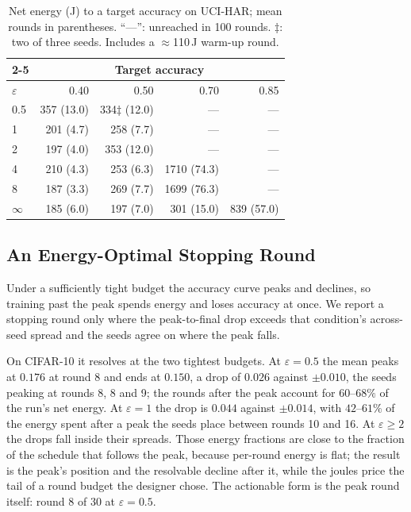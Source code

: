 \begin{table}[t]
\caption{Net energy (J) to a target accuracy on UCI-HAR; mean rounds in
parentheses. ``---'': unreached in 100 rounds. $\ddagger$: two of three
seeds. Includes a $\approx$110\,J warm-up round.}
\label{tab:target}
\centering
\begin{tabular}{lrrrr}
\cline{2-5}
 & \multicolumn{4}{c}{Target accuracy} \\
\hline
$\varepsilon$ & 0.40 & 0.50 & 0.70 & 0.85 \\
\hline
0.5       & 357 (13.0) & 334$\ddagger$ (12.0) & ---         & --- \\
1         & 201 (4.7)  & 258 (7.7)  & ---         & --- \\
2         & 197 (4.0)  & 353 (12.0) & ---         & --- \\
4         & 210 (4.3)  & 253 (6.3)  & 1710 (74.3) & --- \\
8         & 187 (3.3)  & 269 (7.7)  & 1699 (76.3) & --- \\
$\infty$  & 185 (6.0)  & 197 (7.0)  & 301 (15.0)  & 839 (57.0) \\
\hline
\end{tabular}
\end{table}

\subsection{An Energy-Optimal Stopping Round}

Under a sufficiently tight budget the accuracy curve peaks and declines, so
training past the peak spends energy and loses accuracy at once. We report a
stopping round only where the peak-to-final drop exceeds that condition's
across-seed spread and the seeds agree on where the peak falls.

On CIFAR-10 it resolves at the two tightest budgets. At $\varepsilon = 0.5$
the mean peaks at $0.176$ at round 8 and ends at $0.150$, a drop of $0.026$
against $\pm 0.010$, the seeds peaking at rounds 8, 8 and 9; the rounds after
the peak account for $60$--$68\%$ of the run's net energy. At $\varepsilon =
1$ the drop is $0.044$ against $\pm 0.014$, with $42$--$61\%$ of the energy
spent after a peak the seeds place between rounds 10 and 16. At $\varepsilon
\ge 2$ the drops fall inside their spreads. Those energy fractions are close
to the fraction of the schedule that follows the peak, because per-round
energy is flat; the result is the peak's position and the resolvable decline
after it, while the joules price the tail of a round budget the designer
chose. The actionable form is the peak round itself: round 8 of 30 at
$\varepsilon = 0.5$.

